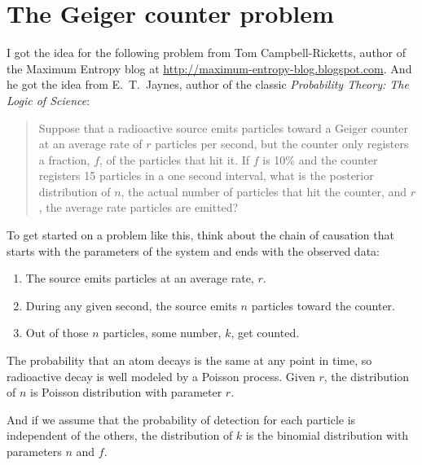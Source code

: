 \documentclass[12pt]{book}
\begin{document}
\section{The Geiger counter problem}

I got the idea for the following problem from Tom Campbell-Ricketts,
author of the Maximum Entropy blog at
\url{http://maximum-entropy-blog.blogspot.com}.  And he got the idea
from E.~T.~Jaynes, author of the classic {\em Probability Theory: The
  Logic of Science}:

\begin{quote}
Suppose that a radioactive source emits particles toward
a Geiger counter at an average rate of $r$ particles per second,
but the counter only registers a fraction, $f$, of the particles
that hit it.  If $f$ is 10\% and
the counter registers 15 particles in a one second
interval, what is the posterior distribution of $n$, the actual
number of particles that hit the counter, and $r$, the average
rate particles are emitted?
\end{quote}

To get started on a problem like this, think about the chain of
causation that starts with the parameters of the system and ends
with the observed data:

\begin{enumerate}

\item The source emits particles at an average rate, $r$.

\item During any given second, the source emits $n$ particles
toward the counter.

\item Out of those $n$ particles, some number, $k$, get counted.

\end{enumerate}

The probability that an atom decays is the same at any point in time,
so radioactive decay is well modeled by a Poisson process.  Given $r$,
the distribution of $n$ is Poisson distribution with parameter $r$.

And if we assume that the probability of detection for each particle
is independent of the others, the distribution of $k$ is the binomial
distribution with parameters $n$ and $f$.
\end{document}
